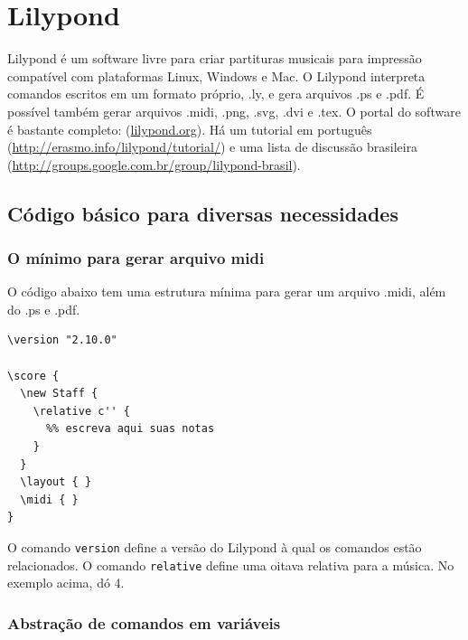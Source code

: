 \documentclass[12pt,brazil]{book}
\begin{document}


\chapter{Lilypond}
\label{sec:lilypond}

Lilypond é um software livre para criar partituras musicais para
impressão compatível com plataformas Linux, Windows e Mac. O Lilypond
interpreta comandos escritos em um formato próprio, .ly, e gera
arquivos .ps e .pdf. É possível também gerar arquivos .midi, .png,
.svg, .dvi e .tex. O portal do software é bastante completo:
(\url{lilypond.org}). Há um tutorial em português
(\url{http://erasmo.info/lilypond/tutorial/}) e uma lista de discussão
brasileira (\url{http://groups.google.com.br/group/lilypond-brasil}).


\section{Código básico para diversas necessidades}
\label{sec:codigo-basico-para}

\subsection{O mínimo para gerar arquivo midi}
\label{sec:o-minimo-para}

O código abaixo tem uma estrutura mínima para gerar um arquivo .midi,
além do .ps e .pdf.

\begin{verbatim}
\version "2.10.0"

\score {
  \new Staff {
    \relative c'' {
      %% escreva aqui suas notas
    }
  }
  \layout { }
  \midi { }
}
\end{verbatim}

O comando \texttt{version} define a versão do Lilypond à qual os
comandos estão relacionados. O comando \texttt{relative} define uma
oitava relativa para a música. No exemplo acima, dó 4.

\subsection{Abstração de comandos em variáveis}
\label{sec:abstr-de-comand}
\end{document}
